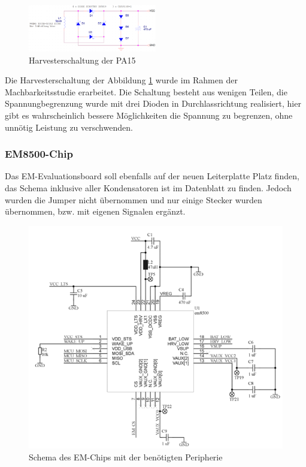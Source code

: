 \begin{figure}[ht]
    \includegraphics[width=0.5\textwidth]{3Vorgehen/imag/Schema_Harvester_PA.png}
    \caption{Harvesterschaltung der PA15}
    \label{schema_harvester_pa15} 
\end{figure}

Die Harvesterschaltung der Abbildung \ref{schema_harvester_pa15} wurde im Rahmen der Machbarkeitsstudie erarbeitet. Die Schaltung besteht aus wenigen Teilen, die Spannungbegrenzung wurde mit drei Dioden in Durchlassrichtung realisiert, hier gibt es wahrscheinlich bessere Möglichkeiten die Spannung zu begrenzen, ohne unnötig Leistung zu verschwenden.

\subsubsection{EM8500-Chip}

Das EM-Evaluationsboard soll ebenfalls auf der neuen Leiterplatte Platz finden, das Schema inklusive aller Kondensatoren ist im Datenblatt zu finden. Jedoch wurden die Jumper nicht übernommen und nur einige Stecker wurden übernommen, bzw. mit eigenen Signalen ergänzt.

\begin{figure}[ht]
    \includegraphics[width=1.0\textwidth]{3Vorgehen/imag/Schema_EM-Chip_inkl_Peripherie.png}
    \caption{Schema des EM-Chips mit der benötigten Peripherie}\label{schema_em-chip_inkl_peripherie} 
\end{figure}

